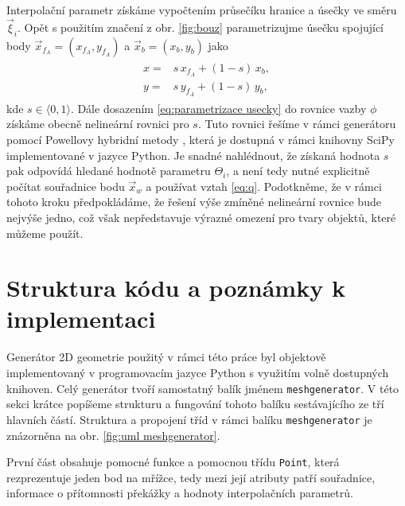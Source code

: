 Interpolační parametr získáme vypočtením průsečíku hranice a úsečky ve směru $ \vec{\xi}_i $. Opět s použitím značení z obr. \ref{fig:bouz} parametrizujme úsečku spojující body $ \vec{x}_{f{_A}} = (x_{f{_A}}, y_{f{_A}})$ a $ \vec{x}_b  = (x_b, y_b)$ jako
\begin{align}\label{eq:parametrizace usecky}
\begin{split}
x=& s \, x_{f{_A}} + (1 - s) \, x_b,
\\
y=& s \, y_{f{_A}} + (1 - s) \, y_b ,
\end{split}
\end{align}
kde $ s \in \langle 0, 1 \rangle $. Dále dosazením \eqref{eq:parametrizace usecky} do rovnice vazby $ \phi $ získáme obecně nelineární rovnici pro $ s $. Tuto rovnici řešíme v rámci generátoru pomocí Powellovy hybridní metody \cite{Powell}, která je dostupná v rámci knihovny SciPy implementované v jazyce Python. Je snadné nahlédnout, že získaná hodnota $ s $ pak odpovídá hledané hodnotě parametru $ \Theta_i $, a není tedy nutné explicitně počítat souřadnice bodu  $ \vec{x}_w $ a používat vztah \eqref{eq:q}. Podotkněme, že v rámci tohoto kroku předpokládáme, že řešení výše zmíněné nelineární rovnice bude nejvýše jedno, což však nepředstavuje výrazné omezení pro tvary objektů, které můžeme použít.

\section{Struktura kódu a poznámky k implementaci}\label{meshgenenator}
Generátor 2D geometrie použitý v rámci této práce byl objektově implementovaný v programovacím jazyce Python s využitím volně dostupných knihoven. Celý generátor tvoří samostatný balík jménem \texttt{meshgenerator}. V této sekci krátce popíšeme strukturu a fungování tohoto balíku sestávajícího ze tří hlavních částí. Struktura a propojení tříd v rámci balíku \texttt{meshgenerator} je znázorněna na obr. \ref{fig:uml meshgenerator}.

První část obsahuje pomocné funkce a pomocnou třídu \texttt{Point}, která rezprezentuje jeden bod na mřížce, tedy mezi její atributy patří souřadnice, informace o přítomnosti překážky a hodnoty interpolačních parametrů.

